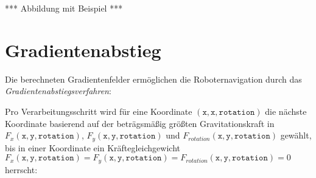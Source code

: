 *** Abbildung mit Beispiel ***


\section{Gradientenabstieg}

Die berechneten Gradientenfelder ermöglichen die Roboternavigation durch das \textit{Gradientenabstiegsverfahren}:

Pro Verarbeitungsschritt wird für eine Koordinate $(\texttt{x},\texttt{x},\texttt{rotation})$ die nächste Koordinate basierend auf der beträgsmäßig größten Gravitationskraft in $F_{x}(\texttt{x}, \texttt{y}, \texttt{rotation})$, $F_{y}(\texttt{x}, \texttt{y}, \texttt{rotation})$ und $F_{rotation}(\texttt{x}, \texttt{y}, \texttt{rotation})$ gewählt, bis in einer Koordinate ein Kräftegleichgewicht $F_{x}(\texttt{x}, \texttt{y}, \texttt{rotation}) = F_{y}(\texttt{x}, \texttt{y}, \texttt{rotation}) = F_{rotation}(\texttt{x}, \texttt{y}, \texttt{rotation}) = 0$ herrscht:


